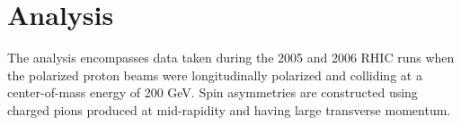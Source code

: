 \chapter{Analysis}

The analysis encompasses data taken during the 2005 and 2006 RHIC runs when
the polarized proton beams were longitudinally polarized and colliding at a
center-of-mass energy of 200 GeV. Spin asymmetries are constructed using
charged pions produced at mid-rapidity and having large transverse momentum.






